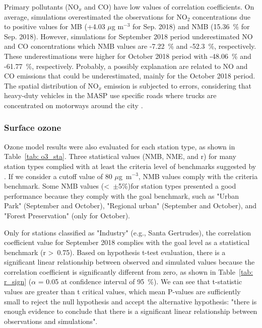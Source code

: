   Primary pollutants (NO$_x$ and CO) have low values of correlation coefficients.
  On average, simulations overestimated the observations for NO$_2$ concentrations due to positive values for MB (+4.03 $\mu$g m$^{-3}$ for Sep. 2018) and NMB (15.36~\% for Sep. 2018).
  However, simulations for September 2018 period underestimated NO and CO concentrations which NMB values are -7.22~\% and -52.3~\%, respectively.
  These underestimations were higher for October 2018 period with -48.06~\% and -61.77~\%, respectively.
  Probably, a possibly explanation are related to NO and CO emissions that could be underestimated, mainly for the October 2018 period.
  The spatial distribution of NO$_x$ emission is subjected to errors, considering that heavy-duty vehicles in the MASP use specific roads where trucks are concentrated on motorways around the city \citep{Ibarra2020}.
  
  
  
   \subsubsection{Surface ozone}
  Ozone model results were also evaluated for each station type, as shown in Table~\ref{tab: o3_sta}. 
  Three statistical values (NMB, NME, and r) for many station types complied with at least the criteria level of benchmarks suggested by \citet{Emery2017}.
  If we consider a cutoff value of 80 $\mu$g~m$^{-3}$, NMB values comply with the criteria benchmark. 
  Some NMB values (<~$\pm$5\%)for station types presented a good performance because they comply with the goal benchmark, such as "Urban Park" (September and October), "Regional urban" (September and October), and "Forest Preservation" (only for October).

  Only for stations classified as "Industry" (e.g., Santa Gertrudes), the correlation coefficient value for September 2018 complies with the goal level as a statistical benchmark (r >~0.75).
  Based on hypothesis t-test evaluation, there is a significant linear relationship between observed and simulated values because the correlation coefficient is significantly different from zero, as shown in Table~\ref{tab: r_sign} ($\alpha$ = 0.05 at confidence interval of 95~\%).
  We can see that t-statistic values are greater than t critical values, which mean P-values are sufficiently small to reject the null hypothesis and accept the alternative hypothesis: "there is enough evidence to conclude that there is a significant linear relationship between observations and simulations".
  
  
  
